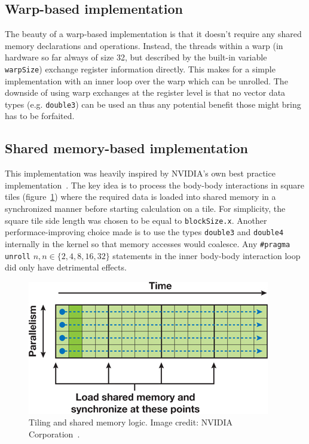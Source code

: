 \documentclass[11pt,a4paper]{article}
\begin{document}
\subsection{Warp-based implementation}
The beauty of a warp-based implementation is that it doesn't require any shared memory declarations
and operations. Instead, the threads within a warp (in hardware so far always of size 32, but described 
by the built-in variable \texttt{warpSize}) exchange register information directly. This makes for a 
simple implementation with an inner loop over the warp which can be unrolled. The downside
of using warp exchanges at the register level is that no vector data types (e.g. \texttt{double3}) can be 
used an thus any potential benefit those might bring has to be forfaited.


\subsection{Shared memory-based implementation}
This implementation was heavily inspired by NVIDIA's own best practice implementation~\cite{nbody}.
The key idea is to process the body-body interactions in square tiles (figure~\ref{fig:1}) where the
required data is loaded into shared memory in a synchronized manner before starting calculation on a tile.
For simplicity, the square tile side length was chosen to be equal to \texttt{blockSize.x}.
Another performace-improving choice made is to use the types \texttt{double3} and \texttt{double4} internally
in the kernel so that memory accesses would coalesce. Any \texttt{\#pragma unroll} $n, n\in \{2, 4, 8, 16, 32\}$ statements
in the inner body-body interaction loop did only have detrimental effects.

\begin{figure}[ht]
	\begin{center}
	\includegraphics[scale=1.0]{tiles.jpg} 
	\end{center}
	\caption{Tiling and shared memory logic. Image credit: NVIDIA Corporation~\cite{nbody}.}
	\label{fig:1}
	\end{figure}
	
\end{document}
